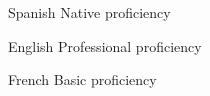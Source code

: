 
\begin{cvskills}

  \cvskill
    {Spanish} %
    {Native proficiency} %
    
  \cvskill
    {English} %
    {Professional proficiency} %

  \cvskill
    {French} %
    {Basic proficiency} %
    
\end{cvskills}
